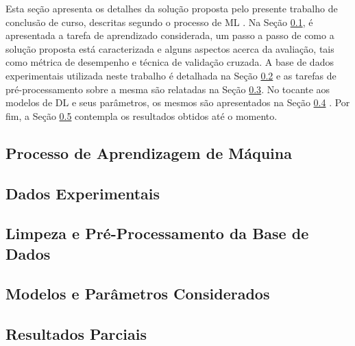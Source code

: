 Esta seção apresenta os detalhes da solução proposta pelo presente trabalho de conclusão de curso, descritas segundo o processo de ML \cite[vide Seção 1.5]{ref:marsland}. Na Seção  \ref{subsec:tarefa}, é apresentada a tarefa de aprendizado considerada, um passo a passo de como a solução proposta está caracterizada e alguns aspectos acerca da avaliação, tais como métrica de desempenho e técnica de validação cruzada. A base de dados experimentais utilizada neste trabalho é detalhada na Seção \ref{subsec:dados} e as tarefas de pré-processamento sobre a mesma são relatadas na Seção \ref{subsec:pre-process}. No tocante aos modelos de DL e seus parâmetros, os mesmos são apresentados na Seção \ref{subsec:modelos} . Por fim, a Seção \ref{subsec:resultados} contempla os resultados obtidos até o momento.

\subsection{Processo de Aprendizagem de Máquina} \label{subsec:tarefa}


\subsection{Dados Experimentais} \label{subsec:dados}


\subsection{Limpeza e Pré-Processamento da Base de Dados} \label{subsec:pre-process}


\subsection{Modelos e Parâmetros Considerados} \label{subsec:modelos}


\subsection{Resultados Parciais}
\label{subsec:resultados}




%
